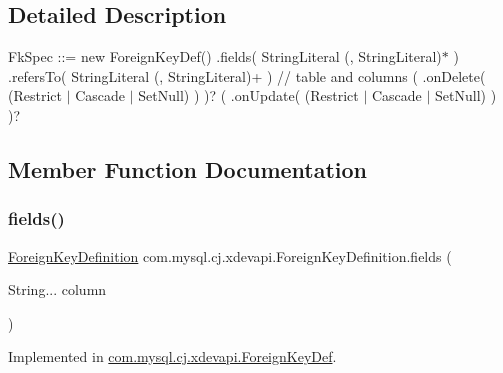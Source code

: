 \subsection{Detailed Description}
Fk\+Spec \+:\+:= \textquotesingle{}new Foreign\+Key\+Def()\textquotesingle{} \textquotesingle{}.fields(\textquotesingle{} String\+Literal (\textquotesingle{},\textquotesingle{} String\+Literal)$\ast$ \textquotesingle{})\textquotesingle{} \textquotesingle{}.refers\+To(\textquotesingle{} String\+Literal (\textquotesingle{},\textquotesingle{} String\+Literal)+ \textquotesingle{})\textquotesingle{} // table and columns ( \textquotesingle{}.on\+Delete(\textquotesingle{} (\textquotesingle{}Restrict\textquotesingle{} $\vert$ \textquotesingle{}Cascade\textquotesingle{} $\vert$ \textquotesingle{}Set\+Null\textquotesingle{}) \textquotesingle{})\textquotesingle{} )? ( \textquotesingle{}.on\+Update(\textquotesingle{} (\textquotesingle{}Restrict\textquotesingle{} $\vert$ \textquotesingle{}Cascade\textquotesingle{} $\vert$ \textquotesingle{}Set\+Null\textquotesingle{}) \textquotesingle{})\textquotesingle{} )? 

\subsection{Member Function Documentation}
\mbox{\label{interfacecom_1_1mysql_1_1cj_1_1xdevapi_1_1_foreign_key_definition_aa7d8e7f02ea79f326fd65479d21e2b1f}} 
\subsubsection{\texorpdfstring{fields()}{fields()}}
{\footnotesize\ttfamily \mbox{\hyperlink{interfacecom_1_1mysql_1_1cj_1_1xdevapi_1_1_foreign_key_definition}{Foreign\+Key\+Definition}} com.\+mysql.\+cj.\+xdevapi.\+Foreign\+Key\+Definition.\+fields (\begin{DoxyParamCaption}\item[{String...}]{column }\end{DoxyParamCaption})}



Implemented in \mbox{\hyperlink{classcom_1_1mysql_1_1cj_1_1xdevapi_1_1_foreign_key_def_acc462cbe87a4a3c4b53244d86a258070}{com.\+mysql.\+cj.\+xdevapi.\+Foreign\+Key\+Def}}.

